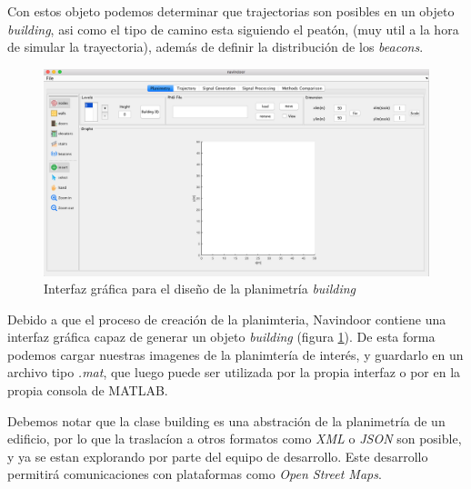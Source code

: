 Con estos objeto podemos determinar que trajectorias son posibles en un objeto \emph{building}, asi como el tipo de camino esta siguiendo el peatón, (muy util a la hora de simular la trayectoria), además de definir la distribución de los \emph{beacons}. 

\begin{figure}[!ht]
    \includegraphics[width=1.0\columnwidth]{img/Design/1-interfaz.png}
    \caption[]{Interfaz gráfica para el diseño de la planimetría \emph{building}}
    \label{fig:interfaz1}
\end{figure}

Debido a que el proceso de creación de la planimteria, Navindoor contiene una interfaz gráfica  capaz de generar un objeto \emph{building} (figura \ref{fig:interfaz1}).  De esta forma podemos cargar nuestras imagenes de la planimtería de interés, y guardarlo en un archivo tipo \emph{.mat}, que luego puede ser utilizada por la propia interfaz o por en la propia consola de MATLAB. 



Debemos notar que la clase building es una abstración de la planimetría de un edificio, por lo que la traslacíon a otros formatos como \emph{XML} o \emph{JSON} son posible, y ya se estan explorando por parte del equipo de desarrollo. Este desarrollo permitirá comunicaciones con plataformas como \emph{Open Street Maps}.




